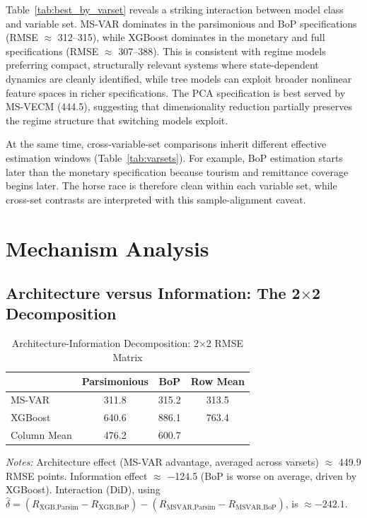 \documentclass[12pt,a4paper]{article}
\begin{document}
Table~\ref{tab:best_by_varset} reveals a striking interaction between model class and variable set. MS-VAR dominates in the parsimonious and BoP specifications (RMSE $\approx$ 312--315), while XGBoost dominates in the monetary and full specifications (RMSE $\approx$ 307--388). This is consistent with regime models preferring compact, structurally relevant systems where state-dependent dynamics are cleanly identified, while tree models can exploit broader nonlinear feature spaces in richer specifications. The PCA specification is best served by MS-VECM (444.5), suggesting that dimensionality reduction partially preserves the regime structure that switching models exploit.

At the same time, cross-variable-set comparisons inherit different effective estimation windows (Table~\ref{tab:varsets}). For example, BoP estimation starts later than the monetary specification because tourism and remittance coverage begins later. The horse race is therefore clean within each variable set, while cross-set contrasts are interpreted with this sample-alignment caveat.

\section{Mechanism Analysis}
\label{sec:mechanism}

\subsection{Architecture versus Information: The 2$\times$2 Decomposition}

\begin{table}[htbp]
\centering
\caption{Architecture-Information Decomposition: 2$\times$2 RMSE Matrix}
\label{tab:did}
\begin{tabular}{lcc|c}
\toprule
& Parsimonious & BoP & Row Mean \\
\midrule
MS-VAR & 311.8 & 315.2 & 313.5 \\
XGBoost & 640.6 & 886.1 & 763.4 \\
\midrule
Column Mean & 476.2 & 600.7 & \\
\bottomrule
\end{tabular}
\begin{tablenotes}
\small
\item \textit{Notes:} Architecture effect (MS-VAR advantage, averaged across varsets) $\approx$ 449.9 RMSE points. Information effect $\approx$ $-$124.5 (BoP is worse on average, driven by XGBoost). Interaction (DiD), using $\hat{\delta} = (R_{\text{XGB,Parsim}} - R_{\text{XGB,BoP}}) - (R_{\text{MSVAR,Parsim}} - R_{\text{MSVAR,BoP}})$, is $\approx -242.1$.
\end{tablenotes}
\end{table}
\end{document}
